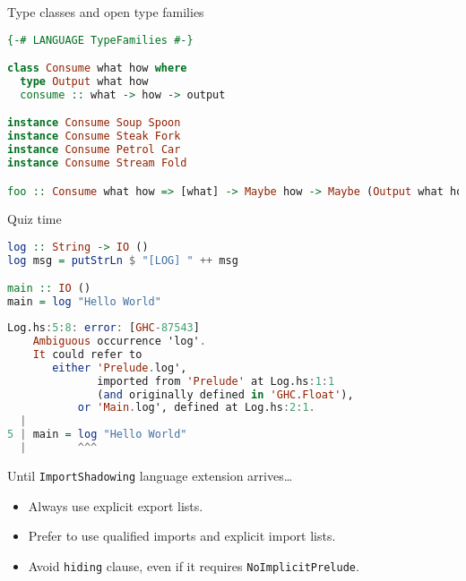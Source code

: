 \documentclass[handout]{beamer}
\begin{document}
\begin{frame}[fragile]{Type classes and open type families}

\begin{lstlisting}[language=Haskell]
{-# LANGUAGE TypeFamilies #-}

class Consume what how where
  type Output what how
  consume :: what -> how -> output

instance Consume Soup Spoon
instance Consume Steak Fork
instance Consume Petrol Car
instance Consume Stream Fold

foo :: Consume what how => [what] -> Maybe how -> Maybe (Output what how)
\end{lstlisting}

\end{frame}

\begin{frame}[fragile]{Quiz time}

\begin{lstlisting}[language=Haskell]
log :: String -> IO ()
log msg = putStrLn $ "[LOG] " ++ msg

main :: IO ()
main = log "Hello World"
\end{lstlisting}

\pause

\begin{lstlisting}[language=Haskell]
Log.hs:5:8: error: [GHC-87543]
    Ambiguous occurrence 'log'.
    It could refer to
       either 'Prelude.log',
              imported from 'Prelude' at Log.hs:1:1
              (and originally defined in 'GHC.Float'),
           or 'Main.log', defined at Log.hs:2:1.
  |
5 | main = log "Hello World"
  |        ^^^
\end{lstlisting}

\end{frame}

\begin{frame}{Until {\tt ImportShadowing} language extension arrives\ldots}

\begin{itemize}[<+->]\itemsep3ex
  \item Always use explicit export lists.
  \item Prefer to use qualified imports and explicit import lists.
  \item Avoid {\tt hiding} clause, even if it requires {\tt NoImplicitPrelude}.
\end{itemize}

\end{frame}
\end{document}
